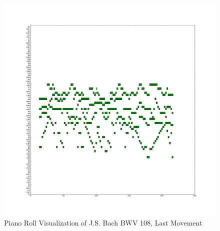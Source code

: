 \begin{figure}
  \begin{center}
    \includegraphics[scale=0.35]{resources/bwv108PianoRoll}
    \caption{Piano Roll Visualization of J.S. Bach BWV 108, Last Movement}
    \label{fig:bwv108PianoRoll}
  \end{center}
\end{figure}